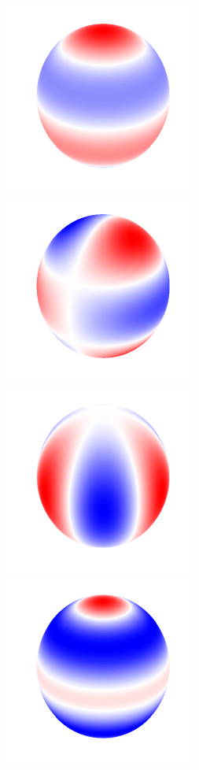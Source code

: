 \documentclass[a4paper,12pt]{book}
\begin{document}
\begin{figure}[bt]
\centering
\includegraphics{./fig-spherical-harmonic-n3-k0.pdf}
\includegraphics{./fig-spherical-harmonic-n3-k1.pdf}
\includegraphics{./fig-spherical-harmonic-n3-k3.pdf}
\includegraphics{./fig-spherical-harmonic-n4-k0.pdf}

\end{figure}
\end{document}
